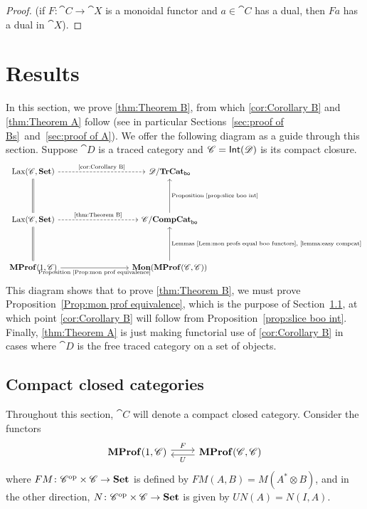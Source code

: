 \documentclass[12pt,oneside,article,draft]{memoir}
\begin{document}
\begin{proof}
(if $F\colon\cat{C}\to\cat{X}$ is a monoidal functor and $a\in\cat{C}$ has a dual, then $Fa$ has a dual in $\cat{X}$).

\end{proof}




\chapter{Results}\label{sec:generalization}

In this section, we prove \ref{thm:Theorem B}, from which \ref{cor:Corollary B} and \ref{thm:Theorem A} follow (see in particular Sections~\ref{sec:proof of Bs}~and~\ref{sec:proof of A}). We offer the following diagram as a guide through this section. Suppose $\cat{D}$ is a traced category and $\mathscr{C}=\mathsf{Int}(\mathscr{D})$ is its compact closure. 
\[
\begin{tikzcd}[column sep=3cm,row sep=1.5cm]
\Lax(\cat{C},\Set)\ar[r,dashed,"\tn{\ref{cor:Corollary B}}"]\ar[d,equal]&\cat{D}/\TrCat_{\bo}\\
\Lax(\cat{C},\Set)\ar[r,dashed,"\tn{\ref{thm:Theorem B}}"]\ar[d,equal]&\cat{C}/\CompCat_{\bo}\ar[u,"\tn{Proposition~\ref{prop:slice boo int}}"']\\
\MProf(1,\cat{C})\ar[r,"\tn{Proposition~\ref{Prop:mon prof equivalence}}"']&\Mon(\MProf(\cat{C},\cat{C}))\ar[u,"\tn{Lemmas~\ref{Lem:mon profs equal boo functors},\ \ref{lemma:easy compcat}}"']
\end{tikzcd}
\]
This diagram shows that to prove \ref{thm:Theorem B}, we must prove Proposition~\ref{Prop:mon prof equivalence}, which is the purpose of Section~\ref{sec:ccc's}, at which point \ref{cor:Corollary B} will follow from Proposition~\ref{prop:slice boo int}. Finally, \ref{thm:Theorem A} is just making functorial use of \ref{cor:Corollary B} in cases where $\cat{D}$ is the free traced category on a set of objects.

\section{Compact closed categories}\label{sec:ccc's}


Throughout this section, $\cat{C}$ will denote a compact closed category. Consider the functors
\[
\begin{tikzcd}
	\MProf(1,\cat{C}) \ar[r,shift left,"F"]
	& \MProf(\cat{C},\cat{C}) \ar[l,shift left,"U"]
\end{tikzcd}
\]
where $FM\colon{\mathscr{C}}^{\text{op}}\times\mathscr{C}\to\mathbf{Set}$ is defined by $FM(A,B)=M(A^*\otimes B)$, and in the other direction, $N\colon{\mathscr{C}}^{\text{op}}\times\mathscr{C}\to\mathbf{Set}$ is given by $UN(A)=N(I,A)$.
\end{document}
